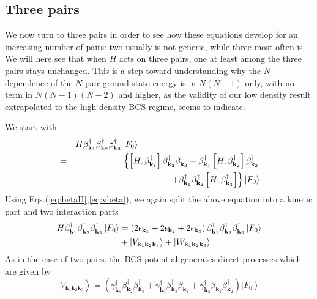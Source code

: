 \documentclass[aps,prb,superscriptaddress,showpacs,reprint,lengthcheck]{revtex4}
\begin{document}
\subsection{Three pairs}

We now turn to three pairs in order to see how these equations develop for an
increasing number of pairs: two usually is not generic, while three most often is.  We will here see that when $H$ acts on three pairs, one at least among the three pairs stays unchanged.   This is a step toward understanding why the $N$ dependence of the $N$-pair ground state energy is in $N(N-1)$ only, with no term in $N(N-1)(N-2)$ and higher, as the validity of our low density result extrapolated to the high density BCS regime, seems to indicate.  


We start with 
\begin{eqnarray}  \label{eq:SchThree}
&&H\beta^{\dagger}_{\mathbf{k} _1}\beta^{\dagger}_{\mathbf{k}
_2}\beta^{\dagger}_{\mathbf{k} _3}\left|F_0\right>  \hspace{5cm}
\nonumber\\
&=&\left\{\left[H,\beta^{\dagger}_{\mathbf{k} _1}\right]  \beta^{\dagger}_{%
\mathbf{k} _2}\beta^{\dagger}_{\mathbf{k} _3}+\beta^{\dagger}_{\mathbf{k} _1}%
\left[H,\beta^{\dagger}_{\mathbf{k} _2}\right]  \beta^{\dagger}_{\mathbf{k}
_3}\right.
\nonumber\\ &&\left.
+\beta^{\dagger}_{\mathbf{k} _1}\beta^{\dagger}_{\mathbf{k} _2}\left[%
H,\beta^{\dagger}_{\mathbf{k} _3}\right]  \right\}
\left|F_0\right> 
\end{eqnarray}%
 Using Eqs.(\ref{eq:betaH},\ref{eq:vbeta}), we again  split the above equation into a kinetic part and two interaction parts
\begin{equation}  \label{eq:SchThree2}
\begin{split}
H\beta^{\dagger}_{\mathbf{k} _1}\beta^{\dagger}_{\mathbf{k}
_2}\beta^{\dagger}_{\mathbf{k} _3}\left|F_0\right>   &=\left(2\epsilon_{%
\mathbf{k} _1}+2\epsilon_{\mathbf{k} _2}+2\epsilon_{\mathbf{k} _3}\right)
\beta^{\dagger}_{\mathbf{k} _1}\beta^{\dagger}_{\mathbf{k}
_2}\beta^{\dagger}_{\mathbf{k} _3}\left|F_0\right>   \\
&+\left|{V}_{\mathbf{k} _1\mathbf{k} _2\mathbf{k} _3}\right> +\left|{W}_{\mathbf{k} _1\mathbf{k} _2\mathbf{k} _3}\right> 
\end{split}%
\end{equation}
As in the case of two pairs, the  BCS potential generates direct processes which are given by 
\begin{equation}  \label{eq:vThree}
\left|V_{\mathbf{k} _1\mathbf{k} _2\mathbf{k} _3}\right> =
\left(\gamma^{\dagger}_{\mathbf{k} _1}\beta^{\dagger}_{\mathbf{k}
_2}\beta^{\dagger}_{\mathbf{k} _3}+\gamma^{\dagger}_{\mathbf{k}
_2}\beta^{\dagger}_{\mathbf{k} _3}\beta^{\dagger}_{\mathbf{k}
_1}+\gamma^{\dagger}_{\mathbf{k} _3}\beta^{\dagger}_{\mathbf{k}
_1}\beta^{\dagger}_{\mathbf{k} _2}\right) \left|F_0\right>   
\end{equation}
\end{document}
